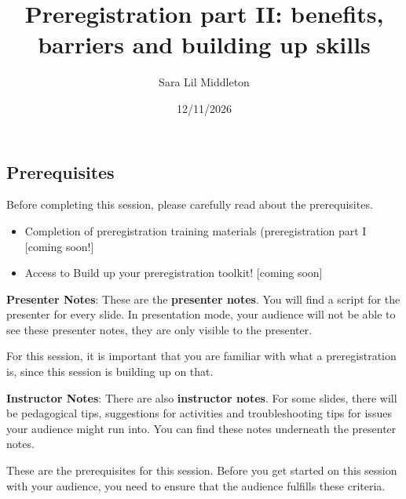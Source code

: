 \documentclass[
  letterpaper,
  DIV=11,
  numbers=noendperiod]{scrartcl}
\title{Preregistration part II: benefits, barriers and building up
skills}
\author{Sara Lil Middleton}
\date{12/11/2026}
\begin{document}
\maketitle


\subsection{Prerequisites}\label{prerequisites}

\begin{tcolorbox}[enhanced jigsaw, arc=.35mm, bottomrule=.15mm, bottomtitle=1mm, breakable, colback=white, colbacktitle=quarto-callout-important-color!10!white, colframe=quarto-callout-important-color-frame, coltitle=black, left=2mm, leftrule=.75mm, opacityback=0, opacitybacktitle=0.6, rightrule=.15mm, title=\textcolor{quarto-callout-important-color}{\faExclamation}\hspace{0.5em}{Important}, titlerule=0mm, toprule=.15mm, toptitle=1mm]

Before completing this session, please carefully read about the
prerequisites.

\end{tcolorbox}

\begin{itemize}
\item
  Completion of preregistration training materials (preregistration part
  I {[}coming soon!{]}
\item
  Access to Build up your preregistration toolkit! {[}coming soon{]}
\end{itemize}

\textbf{Presenter Notes}: These are the \textbf{presenter notes}. You
will find a script for the presenter for every slide. In presentation
mode, your audience will not be able to see these presenter notes, they
are only visible to the presenter.

For this session, it is important that you are familiar with what a
preregistration is, since this session is building up on that.

\textbf{Instructor Notes}: There are also \textbf{instructor notes}. For
some slides, there will be pedagogical tips, suggestions for activities
and troubleshooting tips for issues your audience might run into. You
can find these notes underneath the presenter notes.

These are the prerequisites for this session. Before you get started on
this session with your audience, you need to ensure that the audience
fulfills these criteria.
\end{document}
